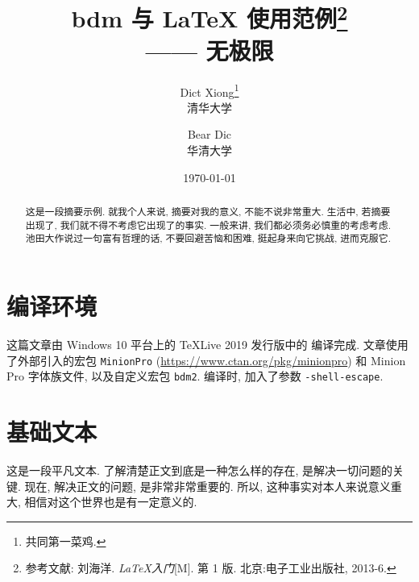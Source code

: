 \documentclass[UTF8,no-math]{ctexart}
\title{bdm 与 \LaTeX{} 使用范例\footnote{参考文献: 刘海洋. \emph{\LaTeX 入门}[M]. 第 1 版. 北京:电子工业出版社, 2013-6.}\\—— \LaTeXe{} 无极限}
\author{Dict Xiong\thanks{共同第一菜鸡.}\\清华大学 \and Bear Dic\footnotemark[2] \\华清大学}
\date{\today}
\numberwithin{enumi}{section}
\begin{document}
    \maketitle
    \begin{abstract}
        这是一段摘要示例. 就我个人来说, 摘要对我的意义, 不能不说非常重大. 生活中, 若摘要出现了, 我们就不得不考虑它出现了的事实. 一般来讲, 我们都必须务必慎重的考虑考虑. 池田大作说过一句富有哲理的话, 不要回避苦恼和困难, 挺起身来向它挑战, 进而克服它.
    \end{abstract}
    \tableofcontents\newpage
    \setcounter{section}{-1}
    \section{编译环境}
    这篇文章由 Windows 10 平台上的 \TeX Live 2019 发行版中的 \XeLaTeX 编译完成. 文章使用了外部引入的宏包 \texttt{MinionPro} (\url{https://www.ctan.org/pkg/minionpro}) 和 Minion Pro 字体族文件, 以及自定义宏包 \texttt{bdm2}. 编译时, 加入了参数 \verb|-shell-escape|.
    
    \section{基础文本}\label{sec:1st}
    这是一段平凡文本. 了解清楚正文到底是一种怎么样的存在, 是解决一切问题的关键. 现在, 解决正文的问题, 是非常非常重要的. 所以, 这种事实对本人来说意义重大, 相信对这个世界也是有一定意义的.  
    
\end{document}
